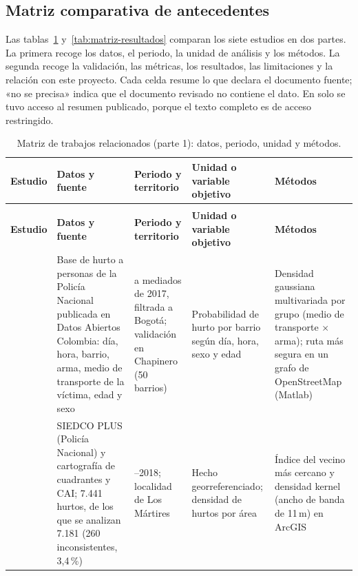 \documentclass[12pt,letterpaper]{article}
\begin{document}
\subsection{Matriz comparativa de antecedentes}

Las tablas~\ref{tab:matriz-datos} y~\ref{tab:matriz-resultados} comparan los siete estudios en dos partes. La primera recoge los datos, el periodo, la unidad de análisis y los métodos. La segunda recoge la validación, las métricas, los resultados, las limitaciones y la relación con este proyecto. Cada celda resume lo que declara el documento fuente; «no se precisa» indica que el documento revisado no contiene el dato. En \citet{urcuqui2020} solo se tuvo acceso al resumen publicado, porque el texto completo es de acceso restringido.

{\footnotesize
\setlength{\tabcolsep}{4pt}
\renewcommand{\arraystretch}{1.15}
\begin{longtable}{@{}>{\raggedright\arraybackslash}p{2.2cm}>{\raggedright\arraybackslash}p{4.0cm}>{\raggedright\arraybackslash}p{2.4cm}>{\raggedright\arraybackslash}p{2.9cm}>{\raggedright\arraybackslash}p{3.0cm}@{}}
\caption{Matriz de trabajos relacionados (parte 1): datos, periodo, unidad y métodos.}\label{tab:matriz-datos}\\
\toprule
\textbf{Estudio} & \textbf{Datos y fuente} & \textbf{Periodo y territorio} & \textbf{Unidad o variable objetivo} & \textbf{Métodos} \\
\midrule
\endfirsthead
\multicolumn{5}{@{}l}{\emph{Tabla~\ref{tab:matriz-datos} (continuación)}}\\
\toprule
\textbf{Estudio} & \textbf{Datos y fuente} & \textbf{Periodo y territorio} & \textbf{Unidad o variable objetivo} & \textbf{Métodos} \\
\midrule
\endhead
\bottomrule
\endfoot
\citet{campo2017} & Base de hurto a personas de la Policía Nacional publicada en Datos Abiertos Colombia: día, hora, barrio, arma, medio de transporte de la víctima, edad y sexo & 2010 a mediados de 2017, filtrada a Bogotá; validación en Chapinero (50 barrios) & Probabilidad de hurto por barrio según día, hora, sexo y edad & Densidad gaussiana multivariada por grupo (medio de transporte $\times$ arma); ruta más segura en un grafo de OpenStreetMap (Matlab) \\
\addlinespace
\citet{fonseca2019} & SIEDCO PLUS (Policía Nacional) y cartografía de cuadrantes y CAI; 7.441 hurtos, de los que se analizan 7.181 (260 inconsistentes, 3,4\,\%) & 2017--2018; localidad de Los Mártires & Hecho georreferenciado; densidad de hurtos por área & Índice del vecino más cercano y densidad kernel (ancho de banda de 11\,m) en ArcGIS \\

\end{longtable}}
\end{document}
